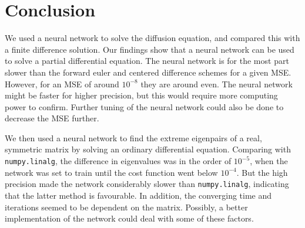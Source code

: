 \section{Conclusion}
\label{sec:conclusion}

We used a neural network to solve the diffusion equation, and compared this with a finite difference solution. Our findings show that a neural network can be used to solve a partial differential equation. The neural network is for the most part slower than the forward euler and centered difference schemes for a given MSE. However, for an MSE of around $10^{-8}$ they are around even. The neural network might be faster for higher precision, but this would require more computing power to confirm. Further tuning of the neural network could also be done to decrease the MSE further.

We then used a neural network to find the extreme eigenpairs of a real, symmetric matrix by solving an ordinary differential equation. Comparing with \texttt{numpy.linalg}, the difference in eigenvalues was in the order of $10^{-5}$, when the network was set to train until the  cost function went below $10^{-4}$. But the high precision made the network considerably slower than \texttt{numpy.linalg}, indicating that the latter method is favourable. In addition, the converging time and iterations seemed to be dependent on the matrix. Possibly, a better implementation of the network could deal with some of these factors.